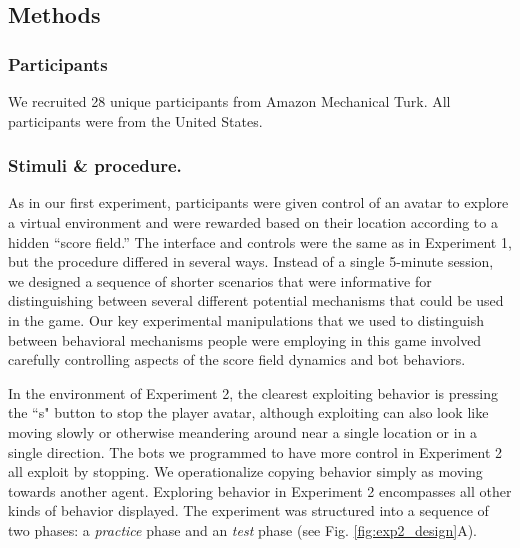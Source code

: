 \documentclass[12pt,letterpaper]{article}
\begin{document}
\subsection{Methods}
\subsubsection{Participants}

We recruited 28 unique participants from Amazon Mechanical Turk.
All participants were from the United States.

\subsubsection{Stimuli \& procedure.}

As in our first experiment, participants were given control of an avatar to explore a virtual environment and were rewarded based on their location according to a hidden ``score field.'' 
The interface and controls were the same as in Experiment 1, but the procedure differed in several ways. 
Instead of a single 5-minute session, we designed a sequence of shorter scenarios that were informative for distinguishing between several different potential mechanisms that could be used in the game. Our key experimental manipulations that we used to distinguish between behavioral mechanisms people were employing in this game involved carefully controlling aspects of the score field dynamics and bot behaviors. 

In the environment of Experiment 2, the clearest exploiting behavior is pressing the ``s" button to stop the player avatar, although exploiting can also look like moving slowly or otherwise meandering around near a single location or in a single direction.  The bots we programmed to have more control in Experiment 2 all exploit by stopping.  We operationalize copying behavior simply as moving towards another agent.  Exploring behavior in Experiment 2 encompasses all other kinds of behavior displayed.
The experiment was structured into a sequence of two phases: a \emph{practice} phase and an \emph{test} phase (see Fig. \ref{fig:exp2_design}A).
\end{document}
